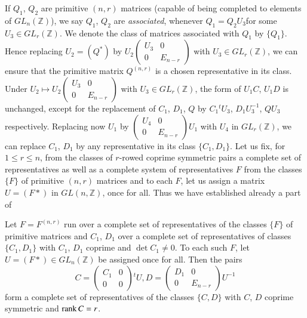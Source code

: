 If $Q_{1}$, $Q_{2}$ are primitive $(n,r)$ matrices (\ie capable of
being completed to elements of $GL_{n}(\mathbb{Z})$), we say $Q_{1}$,
$Q_{2}$ are {\em associated}, whenever
$Q_{1}=Q_{2}U_{3}$\pageoriginale for some $U_{3}\in
GL_{r}(\mathbb{Z})$. We denote the class of matrices associated with
$Q_{1}$ by $\{Q_{1}\}$. Hence replacing $U_{2}=(Q^{\ast})$ by
$U_{2}\left(\begin{smallmatrix} U_{3} & 0\\ 0 & E_{n-r}
\end{smallmatrix}\right)$ with $U_{3}\in GL_{r}(\mathbb{Z})$, we can
ensure that the primitive matrix $Q^{(n,r)}$ is a chosen
representative in its class. Under $U_{2}\mapsto
U_{2}\left(\begin{smallmatrix} U_{3} & 0\\ 0 & E_{n-r}
\end{smallmatrix}\right)$ with $U_{3}\in GL_{r}(\mathbb{Z})$, the form
of $U_{1}C$, $U_{1}D$ is unchanged, except for the replacement of
$C_{1}$, $D_{1}$, $Q$ by $C_{1}{}^{t}U_{3}$, $D_{1}U^{-1}_{3}$,
$QU_{3}$ respectively. Replacing now $U_{1}$ by
$\left(\begin{smallmatrix} U_{4} & 0\\ 0 & E_{n-r}
\end{smallmatrix}\right)U_{1}$ with $U_{4}$ in $GL_{r}(\mathbb{Z})$,
we can replace $C_{1}$, $D_{1}$ by any representative in its class
$\{C_{1},D_{1}\}$. Let us fix, for $1\leq r\leq n$, from the classes
of $r$-rowed coprime symmetric pairs a complete set of representatives
as well as a complete system of representatives $F$ from the classes
$\{F\}$ of primitive $(n,r)$ matrices and to each $F$, let us assign a
matrix $U=(F\ast)$ in $GL(n,\mathbb{Z})$, once for all. Thus we have
established already a part of

\begin{sublemma}\label{c1:lem-1.4.5}
Let $F=F^{(n,r)}$ run over a complete set of representatives of the
classes $\{F\}$ of primitive matrices and $C_{1}$, $D_{1}$ over a
complete set of representatives of classes $\{C_{1},D_{1}\}$ with
$C_{1}$, $D_{1}$ coprime and $\det C_{1}\neq 0$. To each such $F$, let
$U=(F\ast)\in GL_{n}(\mathbb{Z})$ be assigned once for all. Then the
pairs
$$
C=
\begin{pmatrix}
C_{1} & 0\\
0 & 0
\end{pmatrix}
{}^{t}U, D=
\begin{pmatrix}
D_{1} & 0\\
0 & E_{n-r}
\end{pmatrix}
U^{-1}
$$
form a complete set of representatives of the classes $\{C,D\}$ with
$C$, $D$ coprime symmetric and $\operatorname{rank} C=r$.
\end{sublemma}

